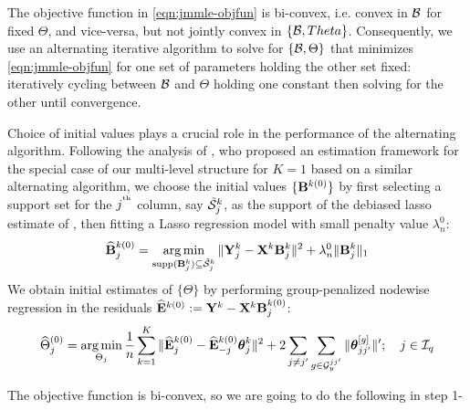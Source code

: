 The objective function in \eqref{eqn:jmmle-objfun} is bi-convex, i.e. convex in ${\cal{B}}$ for fixed $\Theta$, and vice-versa, but not jointly convex in $\{ {\cal{B}}, Theta \}$. Consequently, we use an alternating iterative algorithm to solve for $\{ {\cal{B}}, \Theta \}$ that minimizes \eqref{eqn:jmmle-objfun} for one set of parameters holding the other set fixed: iteratively cycling between ${\cal{B}}$ and $\Theta$ holding one constant then solving for the other until convergence.

Choice of initial values plays a crucial role in the performance of the alternating algorithm. Following the analysis of \cite{LinEtal16}, who proposed an estimation framework for the special case of our multi-level structure for $K=1$ based on a similar alternating algorithm, we choose the initial values $\{ {\mathbf{B}}^{k (0)} \}$ by first selecting a support set for the $j^{\operatorname*{^{\text{th}}}}$ column, say $\tilde {{\cal{S}}}_j^k$, as the support of the debiased lasso estimate of \cite{JavanmardMontanari14}, then fitting a Lasso regression model with small penalty value $\lambda_n^0$:
%
\begin{align}
\widehat {{\mathbf{B}}}_j^{k (0)} = \operatorname*{arg\,min}_{\operatorname*{supp}({\mathbf{B}}_j^k) \subseteq \tilde {{\cal{S}}}_j^k} \|{\mathbf{Y}}_j^k - {\mathbf{X}}^k {\mathbf{B}}_j^k \|^2 + \lambda_n^0 \| {\mathbf{B}}_j^k \|_1
\end{align}
%
We obtain initial estimates of $\{ \Theta \}$ by performing group-penalized nodewise regression in the residuals $\widehat {{\mathbf{E}}}^{k (0)} := {\mathbf{Y}}^k - {\mathbf{X}}^k {\mathbf{B}}_j^{k (0)}$:
%
\begin{align}
\widehat \Theta_j^{(0)} = \operatorname*{arg\,min}_{\Theta_j} \frac{1}{n} \sum_{k=1}^K \|
\widehat {{\mathbf{E}}}_j^{k (0)} - \widehat {{\mathbf{E}}}_{-j}^{k (0)} {\boldsymbol{\theta}}_j^k \|^2
+ 2 \sum_{j \neq j'} \sum_{g \in {\cal{G}}_y^{jj'}} \| {\boldsymbol{\theta}}_{jj'}^{[g]} \|';
\quad j \in {\cal{I}}_q
\end{align}
%
%
%

The objective function is bi-convex, so we are going to do the following in step 1-

